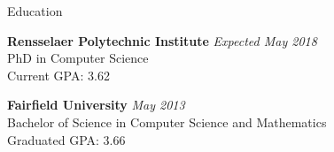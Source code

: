 \documentclass{resume} %
\begin{document}

\begin{rSection}{Education}

{\bf Rensselaer Polytechnic Institute} \hfill {\em Expected May 2018} \\ 
PhD in Computer Science\\
Current GPA: 3.62


{\bf Fairfield University} \hfill {\em May 2013} \\ 
Bachelor of Science in Computer Science and Mathematics\\
Graduated GPA: 3.66

\end{rSection}
\end{document}

